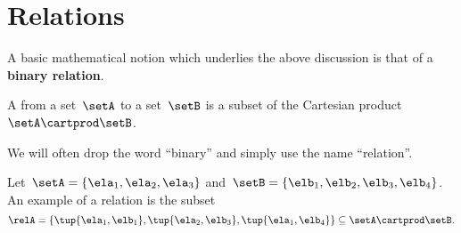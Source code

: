 

\section{Relations}
\label{sec:connection-relations}
A basic mathematical notion which underlies the above discussion is that of a \textbf{binary relation}.

\begin{definition}
    \label{def:binary-relation}
    A \emph{} from a set~$\setA$ to a set~$\setB$ is a subset of the Cartesian product~$\setA\cartprod \setB$.
\end{definition}

\begin{remark}
    We will often drop the word ``binary'' and simply use the name ``relation''.
\end{remark}

\begin{example}
    \label{exa:simple-rel}
    Let~$\setA = \{ \ela_1, \ela_2, \ela_3 \}$ and~$\setB = \{ \elb_1, \elb_2, \elb_3, \elb_4 \}$.
    An example of a relation is the subset
    \begin{equation}
        \relA = \{ \tup{\ela_1, \elb_1}, \tup{\ela_2, \elb_3}, \tup{\ela_1, \elb_4} \} \subseteq \setA \cartprod \setB.
    \end{equation}
\end{example}


